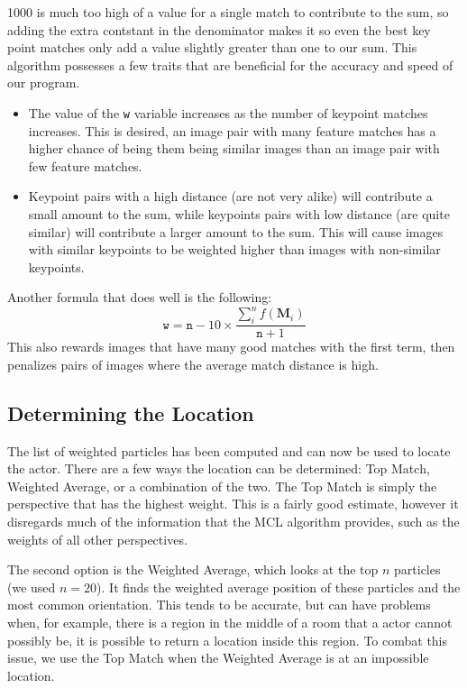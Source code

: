 \documentclass[a4paper,11pt]{article}
\begin{document}
1000 is much too high of a value for a single match to contribute to the sum, so adding the extra contstant in the denominator makes it so even the best key point matches only add a value slightly greater than one to our sum. This algorithm possesses a few traits that are beneficial for the accuracy and speed of our program.
\begin{itemize}
  \item The value of the \texttt{w} variable increases as the number of keypoint matches increases. This is desired, an image pair with many feature matches has a higher chance of being them being similar images than an image pair with few  feature matches.
  \item Keypoint pairs with a high distance (are not very alike) will contribute a small amount to the sum, while keypoints pairs with low distance (are quite similar) will contribute a larger amount to the sum. This will cause images with similar keypoints to be weighted higher than images with non-similar keypoints.
\end{itemize}

Another formula that does well is the following:
\[
\mathtt{w} = \mathtt{n} - 10 \times \frac{\sum_{i}^{n} f(\boldsymbol{M}_i)}{\mathtt{n} + 1}
\]
This also rewards images that have many good matches with the first term, then penalizes pairs of images where the average match distance is high.

\subsection{Determining the Location}
The list of weighted particles has been computed and can now be used to locate the actor. There are a few ways the location can be determined: Top Match, Weighted Average, or a combination of the two. The Top Match is simply the perspective that has the highest weight. This is a fairly good estimate, however it disregards much of the information that the MCL algorithm provides, such as the weights of all other perspectives. 

The second option is the Weighted Average, which looks at the top $n$ particles (we used $n=20$). It finds the weighted average position of these particles and the most common orientation. This tends to be accurate, but can have problems when, for example, there is a region in the middle of a room that a actor cannot possibly be, it is possible to return a location inside this region. To combat this issue, we use the Top Match when the Weighted Average is at an impossible location.
\end{document}
